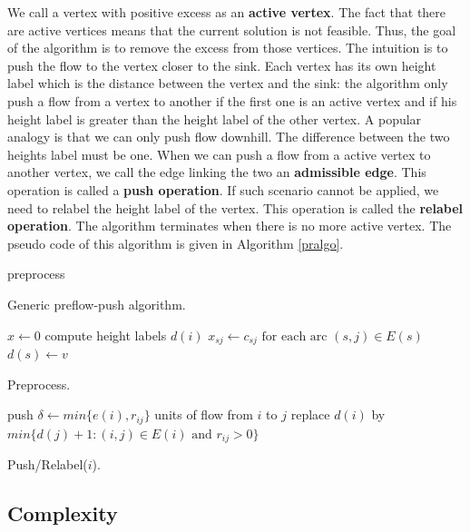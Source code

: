 We call a vertex with positive excess as an \textbf{active vertex}. The fact that there are active vertices means that the current solution is not feasible. Thus, the goal of the algorithm is to remove the excess from those vertices. The intuition is to push the flow to the vertex closer to the sink. Each vertex has its own height label which is the distance between the vertex and the sink: the algorithm only push a flow from a vertex to another if the first one is an active vertex and if his height label is greater than the height label of the other vertex. A popular analogy is that we can only push flow downhill. The difference between the two heights label must be one. When we can push a flow from a active vertex to another vertex, we call the edge linking the two an \textbf{admissible edge}. This operation is called a \textbf{push operation}. If such scenario cannot be applied, we need to relabel the height label of the vertex. This operation is called the \textbf{relabel operation}. The algorithm terminates when there is no more active vertex. The pseudo code of this algorithm is given in  Algorithm \ref{pralgo}.


\begin{algorithm}
 preprocess\;
\caption{Generic preflow-push algorithm.}
\label{pralgo}
\end{algorithm}

\begin{algorithm}
 $x\gets 0$\;
 compute height labels $d(i)$\;
 $x_{sj}\gets c_{sj} \text{ for each arc } (s, j) \in E(s)$\;
 $d(s)\gets v$\;
\caption{Preprocess.}
\label{preprocess}
\end{algorithm}

\begin{algorithm}
  {push $\delta\gets min\{e(i), r_{ij}\}$ units of flow from $i$ to $j$\;}
\Else
   {replace $d(i)$ by $min\{d(j)+1 : (i, j) \in E(i) \text{ and } r_{ij} > 0 \}$\;}
\caption{Push/Relabel($i$).}
\end{algorithm}

\subsection{Complexity}

